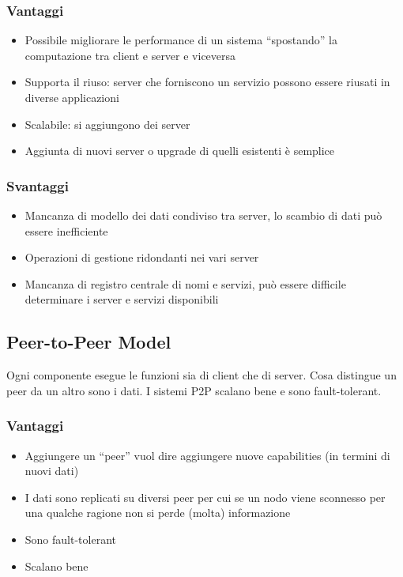 \subsubsection{Vantaggi}
\begin{itemize}
    \item Possibile migliorare le performance di un sistema “spostando” la computazione tra client e server e viceversa
    \item Supporta il riuso: server che forniscono un servizio possono essere riusati in diverse applicazioni
    \item Scalabile: si aggiungono dei server
    \item Aggiunta di nuovi server o upgrade di quelli esistenti è semplice
\end{itemize}

\subsubsection{Svantaggi}
\begin{itemize}
    \item Mancanza di modello dei dati condiviso tra server, lo scambio di dati può essere inefficiente
    \item Operazioni di gestione ridondanti nei vari server
    \item Mancanza di registro centrale di nomi e servizi, può essere difficile determinare i server e servizi disponibili
\end{itemize}

\subsection{Peer-to-Peer Model}
Ogni componente esegue le funzioni sia di client che di server. Cosa distingue un peer da un altro sono i dati. I sistemi P2P scalano bene e sono fault-tolerant.

\subsubsection{Vantaggi}
\begin{itemize}
    \item Aggiungere un “peer” vuol dire aggiungere nuove capabilities (in termini di nuovi dati)
    \item I dati sono replicati su diversi peer per cui se un nodo viene sconnesso per una qualche ragione non si perde (molta) informazione
    \item Sono fault-tolerant
    \item Scalano bene
\end{itemize}

